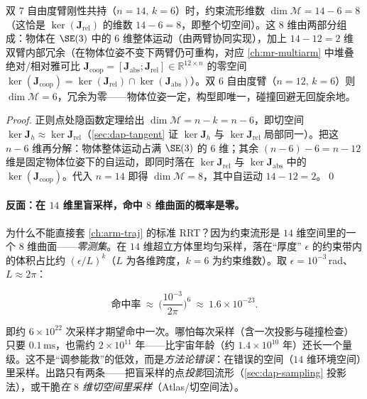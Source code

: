 \begin{proposition}[双臂共持的约束流形维数]\label{prop:dap-dim}
双 $7$ 自由度臂刚性共持（$n=14,\,k=6$）时，约束流形维数 $\dim\mathcal{M}=14-6=8$（这恰是 $\ker(\mathbf{J}_{\text{rel}})$ 的维数 $14-6=8$，即整个切空间）。这 $8$ 维由两部分组成：物体在 $\SE(3)$ 中的 $6$ 维整体运动（由两臂协同实现），加上 $14-12=2$ 维双臂内部冗余（在物体位姿不变下两臂仍可重构，对应 \cref{ch:mr-multiarm} 中堆叠绝对/相对雅可比 $\mathbf{J}_{\text{coop}}=[\mathbf{J}_{\text{abs}};\mathbf{J}_{\text{rel}}]\in\mathbb{R}^{12\times n}$ 的零空间 $\ker(\mathbf{J}_{\text{coop}})=\ker(\mathbf{J}_{\text{rel}})\cap\ker(\mathbf{J}_{\text{abs}})$）。双 $6$ 自由度臂（$n=12,\,k=6$）则 $\dim\mathcal{M}=6$，冗余为零——物体位姿一定，构型即唯一，碰撞回避无回旋余地。
\end{proposition}

\begin{proof}
正则点处隐函数定理给出 $\dim\mathcal{M}=n-k=n-6$，即切空间 $\ker\mathbf{J}_h\approx\ker\mathbf{J}_{\text{rel}}$（\cref{sec:dap-tangent} 证 $\ker\mathbf{J}_h$ 与 $\ker\mathbf{J}_{\text{rel}}$ 局部同一）。把这 $n-6$ 维再分解：物体整体运动占满 $\SE(3)$ 的 $6$ 维；其余 $(n-6)-6=n-12$ 维是固定物体位姿下的自运动，即同时落在 $\ker\mathbf{J}_{\text{rel}}$ 与 $\ker\mathbf{J}_{\text{abs}}$ 中的 $\ker(\mathbf{J}_{\text{coop}})$。代入 $n=14$ 即得 $\dim\mathcal{M}=8$，其中自运动 $14-12=2$。\qed
\end{proof}

\paragraph{反面：在 $14$ 维里盲采样，命中 $8$ 维曲面的概率是零。}
为什么不能直接套 \cref{ch:arm-traj} 的标准 RRT？因为约束流形是 $14$ 维空间里的一个 $8$ 维曲面——\emph{零测集}。在 $14$ 维超立方体里均匀采样，落在“厚度” $\epsilon$ 的约束带内的体积占比约 $(\epsilon/L)^{k}$（$L$ 为各维跨度，$k=6$ 为约束维数）。取 $\epsilon=10^{-3}$\,rad、$L\approx 2\pi$：

\begin{equation}
  \text{命中率}\ \approx\ \Big(\frac{10^{-3}}{2\pi}\Big)^{6}\ \approx\ 1.6\times10^{-23}.
  \label{eq:dap-curse}
\end{equation}

即约 $6\times10^{22}$ 次采样才期望命中一次。哪怕每次采样（含一次投影与碰撞检查）只要 $0.1\,\mathrm{ms}$，也需约 $2\times10^{11}$ 年——比宇宙年龄（约 $1.4\times10^{10}$ 年）还长一个量级。这不是“调参能救”的低效，而是\emph{方法论错误}：在错误的空间（$14$ 维环境空间）里采样。出路只有两条——把盲采样的点\emph{投影}回流形（\cref{sec:dap-sampling} 投影法），或干脆\emph{在 $8$ 维切空间里采样}（Atlas/切空间法）。

